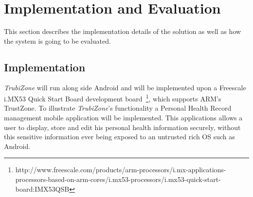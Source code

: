 
% 
% 
\section{Implementation and Evaluation}
\label{sec:evaluation}

This section describes the implementation details of the solution as well as how the system is going to be evaluated.

\subsection{Implementation}

\emph{TrubiZone} will run along side Android and will be implemented upon a Freescale i.MX53 Quick Start Board development board~\footnote{http://www.freescale.com/products/arm-processors/i.mx-applications-processors-based-on-arm-cores/i.mx53-processors/i.mx53-quick-start-board:IMX53QSB}, which supports ARM's TrustZone. To illustrate \emph{TrubiZone}'s functionality a Personal Health Record management mobile application will be implemented. This applications allows a user to display, store and edit his personal health information securely, without this sensitive information ever being exposed to an untrusted rich OS such as Android.




